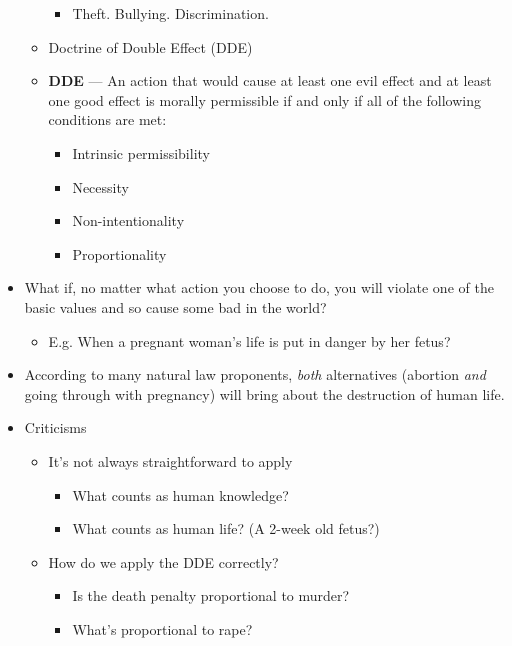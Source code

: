 \documentclass{article}
\begin{document}
\begin{spacing}{1.2}
\begin{itemize}
\begin{itemize}
                        \begin{itemize}
                            \item Theft. Bullying. Discrimination.
                        \end{itemize}
                  \item Doctrine of Double Effect (DDE)
                  \item \textbf{DDE} --- An action that would cause at least one evil effect and at least one good effect is morally permissible if and only if all of the following conditions are met:
                        \begin{itemize}
                            \item Intrinsic permissibility
                            \item Necessity
                            \item Non-intentionality
                            \item Proportionality
                        \end{itemize}
              \end{itemize}
        \item What if, no matter what action you choose to do, you will violate one of the basic values and so cause some bad in the world?
              \begin{itemize}
                  \item E.g. When a pregnant woman's life is put in danger by her fetus?
              \end{itemize}
        \item According to many natural law proponents, \emph{both} alternatives (abortion \emph{and} going through with pregnancy) will bring about the destruction of human life.
        \item Criticisms
              \begin{itemize}
                  \item It's not always straightforward to apply
                        \begin{itemize}
                            \item What counts as human knowledge?
                            \item What counts as human life? (A 2-week old fetus?)
                        \end{itemize}
                  \item How do we apply the DDE correctly?
                        \begin{itemize}
                            \item Is the death penalty proportional to murder?
                            \item What's proportional to rape?
                        \end{itemize}
              \end{itemize}
    \end{itemize}

\end{spacing}
\end{document}
